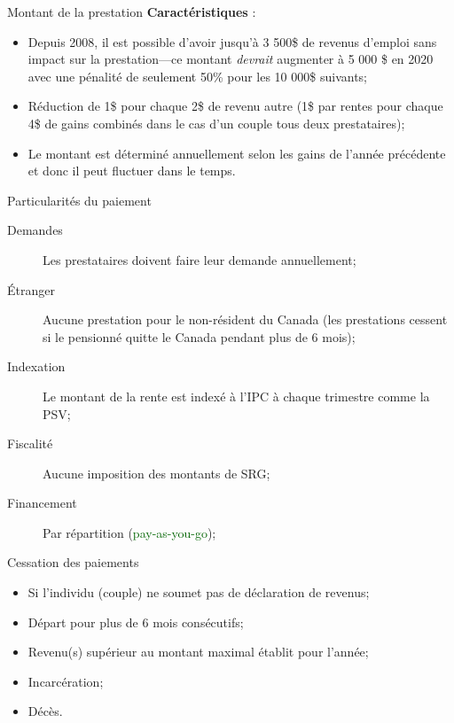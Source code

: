 \documentclass[10pt, french]{article}
\begin{document}
\begin{multicols*}{3}
\begin{conceptgen}{Montant de la prestation}
\textbf{Caractéristiques} : 
\begin{itemize}[leftmargin = *]
	\item	Depuis 2008, il est possible d'avoir jusqu'à 3 500\$ de revenus d'emploi sans impact sur la prestation---ce montant \textit{devrait} augmenter à 5 000 \$ en 2020 avec une pénalité de seulement 50\% pour les 10 000\$ suivants;
	\item	Réduction de 1\$ pour chaque 2\$ de revenu autre (1\$ par rentes pour chaque 4\$ de gains combinés dans le cas d'un couple tous deux prestataires);
	\item	Le montant est déterminé annuellement selon les gains de l'année précédente et donc il peut fluctuer dans le temps.
\end{itemize}
\end{conceptgen}

\begin{conceptgen}{Particularités du paiement}
\begin{description}
	\item[Demandes]	Les prestataires doivent faire leur demande annuellement;
	\item[Étranger]	Aucune prestation pour le non-résident du Canada (les prestations cessent si le pensionné quitte le Canada pendant plus de 6 mois);
	\item[Indexation]	Le montant de la rente est indexé à l'IPC à chaque trimestre comme la PSV;
	\item[Fiscalité]	Aucune imposition des montants de SRG;
	\item[Financement]	Par répartition (\textcolor{darkgreen}{pay-as-you-go});
\end{description}
\end{conceptgen}

\begin{conceptgen}{Cessation des paiements}
\begin{itemize}[leftmargin = *]
	\item	Si l'individu (couple) ne soumet pas de déclaration de revenus;
	\item	Départ pour plus de 6 mois consécutifs;
	\item	Revenu(s) supérieur au montant maximal établit pour l'année;
	\item	Incarcération;
	\item	Décès.
\end{itemize}
\end{conceptgen}

\columnbreak


\end{multicols*}
\end{document}
